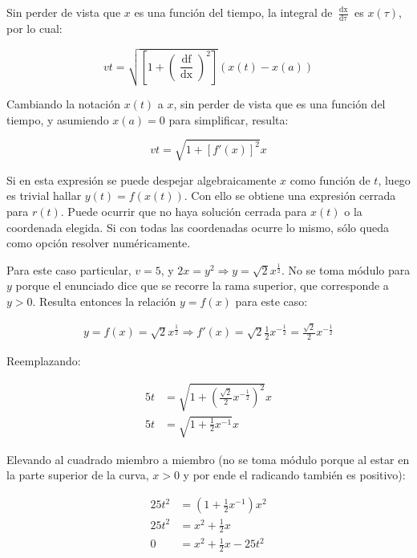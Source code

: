 \documentclass{article}
\begin{document}
Sin perder de vista que $x$ es una función del tiempo, la integral de $\frac{\mathop{dx}}{\mathop{d\tau}}$ es $x(\tau)$, por lo cual:

\begin{equation}
v t = \sqrt{ \left[ 1 + \left( \frac{\mathop{df}}{\mathop{dx}} \right)^2\right] } (x(t) - x(a))
\end{equation}

Cambiando la notación $x(t)$ a $x$, sin perder de vista que es una función del tiempo, y asumiendo $x(a) = 0$ para simplificar, resulta:

\begin{equation}
v t = \sqrt{ 1 + [f'(x)]^2 } x
\end{equation}

Si en esta expresión se puede despejar algebraicamente $x$ como función de $t$, luego es trivial hallar $y(t) = f(x(t))$. Con ello se obtiene una expresión cerrada para $r(t)$. Puede ocurrir que no haya solución cerrada para $x(t)$ o la coordenada elegida. Si con todas las coordenadas ocurre lo mismo, sólo queda como opción resolver numéricamente.

Para este caso particular, $v = 5$, y $2x = y^2 \Rightarrow y = \sqrt{2} x^{\frac{1}{2}}$. No se toma módulo para $y$ porque el enunciado dice que se recorre la rama superior, que corresponde a $y > 0$. Resulta entonces la relación $y = f(x)$ para este caso:

\begin{align}
y = f(x) = \sqrt{2} x^{\frac{1}{2}} \Rightarrow f'(x) = \sqrt{2} \frac{1}{2} x^{-\frac{1}{2}} = \frac{\sqrt{2}}{2} x^{-\frac{1}{2}}
\end{align}

Reemplazando:

\begin{subequations}
\begin{align}
5t &= \sqrt{1 + \left( \frac{\sqrt{2}}{2} x^{-\frac{1}{2}} \right)^2} x \\
5t &= \sqrt{1 + \frac{1}{2} x^{-1}} x
\end{align}
\end{subequations}

Elevando al cuadrado miembro a miembro (no se toma módulo porque al estar en la parte superior de la curva, $x > 0$ y por ende el radicando también es positivo):

\begin{subequations}
\begin{align}
25t^2 &= \left(1 + \frac{1}{2} x^{-1} \right) x^2 \\
25t^2 &= x^2 + \frac{1}{2} x \\
0 &= x^2 + \frac{1}{2} x - 25t^2
\end{align}
\end{subequations}
\end{document}
